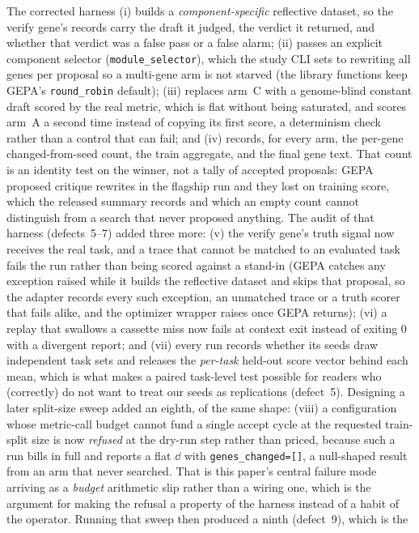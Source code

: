 \documentclass[11pt]{article}
\begin{document}
The corrected harness (i) builds a \emph{component-specific} reflective dataset, so the verify
gene's records carry the draft it judged, the verdict it returned, and whether that verdict
was a false pass or a false alarm; (ii) passes an explicit component selector (\texttt{module\_selector}),
which the study CLI sets to rewriting all genes per proposal so a multi-gene arm is not starved
(the library functions keep GEPA's \texttt{round\_robin} default); (iii) replaces arm~C
with a genome-blind constant draft scored by the real metric, which is flat without being
saturated, and scores arm~A a second time instead of copying its first score, a determinism
check rather than a control that can fail; and (iv) records, for every arm, the
per-gene changed-from-seed count, the train aggregate, and the final gene text. That count is
an identity test on the winner, not a tally of accepted proposals: GEPA proposed critique
rewrites in the flagship run and they lost on training score, which the released summary records
and which an empty count cannot distinguish from a search that never proposed anything. The audit of
that harness (defects~5--7) added three more: (v) the verify gene's truth signal now receives
the real task, and a trace that cannot be matched to an evaluated task fails the run rather than
being scored against a stand-in (GEPA catches any exception raised while it builds the reflective
dataset and skips that proposal, so the adapter records every such exception, an unmatched trace
or a truth scorer that fails alike, and the optimizer wrapper raises once GEPA returns); (vi) a replay that swallows a cassette miss now fails at context
exit instead of exiting $0$ with a divergent report; and (vii) every run records whether its seeds
draw independent task sets and releases the \emph{per-task} held-out score vector behind each mean,
which is what makes a paired task-level test possible for readers who (correctly) do not want to
treat our seeds as replications (defect~5). Designing a later split-size sweep added an eighth, of the
same shape: (viii) a configuration whose metric-call budget cannot fund a single accept cycle
at the requested train-split size is now \emph{refused} at the dry-run step rather than
priced, because such a run bills in full and reports a flat $\dd$ with
\texttt{genes\_changed=[]}, a null-shaped result from an arm that never searched. That is
this paper's central failure mode arriving as a \emph{budget} arithmetic slip rather than a
wiring one, which is the argument for making the refusal a property of the harness instead of
a habit of the operator. Running that sweep then produced a ninth (defect~9), which is the
\end{document}
